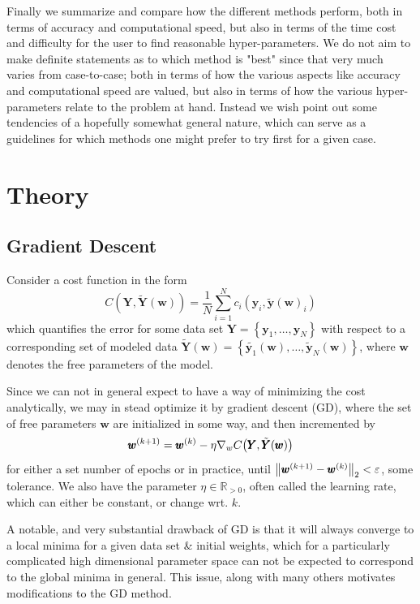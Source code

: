 \documentclass[reprint, english, nofootinbib]{revtex4-2}
\begin{document}
Finally we summarize and compare how the different methods perform, both in terms of accuracy and computational speed, but also in terms of the time cost and difficulty for the user to find reasonable hyper-parameters. We do not aim to make definite statements as to which method is "best" since that very much varies from case-to-case; both in terms of how the various aspects like accuracy and computational speed are valued, but also in terms of how the various hyper-parameters relate to the problem at hand. Instead we wish point out some tendencies of a hopefully somewhat general nature, which can serve as a guidelines for which methods one might prefer to try first for a given case.


\section{Theory}
\subsection{Gradient Descent}
\noindent
Consider a cost function in the form
\begin{equation}
    C(\pmb Y, \tilde{\pmb Y}(\pmb w)) = \frac{1}{N}\sum_{i=1}^{N}c_i(\pmb y_i, \tilde{\pmb y}(\pmb w)_i)
\end{equation}
which quantifies the error for some data set $\pmb Y = \left\{\pmb y_1, \dots, \pmb y_N\right\}$ with respect to a corresponding set of modeled data $\tilde{\pmb Y}(\pmb w) = \left\{\tilde{\pmb y_1}(\pmb w), \dots, \tilde{\pmb y}_N(\pmb w)\right\}$, where $\pmb w$ denotes the free parameters of the model.

Since we can not in general expect to have a way of minimizing the cost analytically, we may in stead optimize it by gradient descent (GD), where the set of free parameters $\pmb w$ are initialized in some way, and then incremented by
\begin{equation}\label{eqn: GD}
    \pmb w^{(k+1)} = \pmb w^{(k)} - \eta \nabla_{w}C\qty(\pmb Y, \tilde{\pmb Y}(\pmb w))
\end{equation}
for either a set number of epochs or in practice, until $\norm{\pmb w^{(k+1)} - \pmb w^{(k)}}_2< \varepsilon$, some tolerance. We also have the parameter $\eta \in \mathbb R_{>0}$, often called the learning rate, which can either be constant, or change wrt. $k$.

A notable, and very substantial drawback of GD is that it will always converge to a local minima for a given data set \& initial weights, which for a particularly complicated high dimensional parameter space can not be expected to correspond to the global minima in general. This issue, along with many others \cite[pp.15-16]{Mehta_2019} motivates modifications to the GD method.
\end{document}
